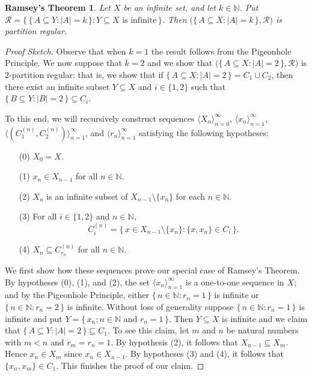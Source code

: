 \documentclass[12pt]{article}
\theoremstyle{plain}
\newtheorem*{ramsey}{Ramsey's Theorem}
\theoremstyle{definition}
\newcommand{\la}{\langle}
\newcommand{\ra}{\rangle}
\newcommand{\bbN}{\mathbb{N}}
\newcommand{\calR}{\mathcal{R}}
\begin{document}
\begin{ramsey}
  Let $X$ be an infinite set, and let $k \in \bbN$.
  Put $\calR = \bigl\{\, \{\, A \subseteq Y : |A| = k \,\} : \mbox{$Y
    \subseteq X$ is infinite} \,\bigr\}$.
  Then $\bigl(\{\, A \subseteq X : |A| = k \,\}, \calR\bigr)$ is
  partition regular. 
\end{ramsey}
\begin{proof}[Proof Sketch]
  Observe that when $k = 1$ the result follows from the Pigeonhole
  Principle. 
  We now suppose that $k=2$ and we show that $\bigl(\{\, A
  \subseteq X : |A| = 2 \,\}, \calR\bigr)$ is \mbox{2-partition}
  regular: that is, we show that if $\{\, A \subseteq X : |A| = 2 \,\}
  = C_1 \cup C_2$, then there exist an infinite subset $Y \subseteq
  X$ and $i \in \{1, 2\}$ such that $\{\, B \subseteq Y : |B| = 2 \,\}
  \subseteq C_i$. 

  To this end, we will recursively construct sequences $\la X_n
  \ra_{n=0}^\infty$, $\la x_n \ra_{n=1}^\infty$, $\bigl\la (C_1^{(n)},
  C_2^{(n)}) \bigr\ra_{n=1}^\infty$, and $\la r_n \ra_{n=1}^\infty$
  satisfying the following hypotheses:
  \begin{itemize}
    \item[(0)] $X_0 = X$.
    \item[(1)] $x_n \in X_{n-1}$ for all $n \in \bbN$.
    \item[(2)] $X_n$ is an infinite subset of $X_{n-1} \setminus
      \{x_n\}$ for each $n \in \bbN$.
    \item[(3)] For all $i \in \{1, 2\}$ and $n \in \bbN$, 
      \[
        C_i^{(n)} = \{\, x \in X_{n-1} \setminus \{x_n\} : \{x, x_n\}
        \in C_i \,\}.
      \]
    \item[(4)] $X_n \subseteq C_{r_n}^{(n)}$ for all $n \in \bbN$. 
  \end{itemize}
  We first show how these sequences prove our special case of Ramsey's
  Theorem. 
  By hypotheses (0), (1), and (2), the set $\la x_n \ra_{n=1}^\infty$
  is a one-to-one sequence in $X$; and by the Pigeonhole Principle,
  either $\{\, n \in \bbN : r_n = 1 \,\}$ is infinite or $\{\, n \in
  \bbN : r_n = 2 \,\}$ is infinite. 
  Without loss of generality suppose $\{\, n \in \bbN : r_n = 1 \,\}$
  is infinite and put $Y = \{\, x_n : \mbox{$n \in \bbN$ and $r_n =
    1$} \,\}$.
  Then $Y \subseteq X$ is infinite and we claim that $\{\, A \subseteq
  Y : |A| = 2\,\} \subseteq C_1$.
  To see this claim, let $m$ and $n$ be natural numbers with $m < n$
  and $r_m = r_n = 1$. 
  By hypothesis (2), it follows that $X_{n-1} \subseteq X_m$. 
  Hence $x_n \in X_m$ since $x_n \in X_{n-1}$. 
  By hypotheses (3) and (4), it follows that $\{x_n , x_m \} \in
  C_1$. 
  This finishes the proof of our claim.


\end{proof}
\end{document}
